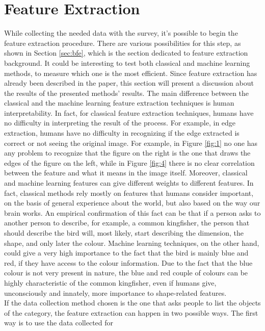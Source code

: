 \documentclass[conference]{IEEEtran}
\begin{document}
	\section{Feature Extraction\label{sec:fe}}

		\noindent While collecting the needed data with the survey, it's possible to begin the feature extraction procedure. There are various possibilities for this step, as shown in Section \ref{sec:bfe}, which is
		the section dedicated to feature extraction background. 
		It could be interesting to test both classical and machine learning methods, to measure which one is the most efficient. Since feature extraction has already been described in the paper, this section will 
		present a discussion about the results of the presented methods' results. The main difference between the classical and the machine learning feature extraction techniques is human interpretability. 
		In fact, for classical feature extraction techniques, humans have no difficulty in interpreting the result of the process. For example, in edge extraction, humans have no difficulty in recognizing if the 
		edge extracted is correct or not seeing the original image. For example, in Figure \ref{fig:1} no one has any problem to recognize that the figure on the right is the one that draws the edges of the figure on the left, 
		while in Figure \ref{fig:4} there is no clear correlation between the feature and what it means in the image itself.
		Moreover, classical and machine learning features can give different weights to different features. 
		In fact, classical methods rely mostly on features that humans consider important, on the basis of general experience about the world, but also based on the way our brain works. An empirical confirmation of this fact 
		can be that if a person asks to another person to describe, for example, a common kingfisher, the person that should describe the bird will, most likely, start describing the dimension, the shape, and only 
		later the colour. Machine learning techniques, on the other hand, could give a very high importance to the fact that the bird is mainly blue and red, if they have access to the colour information. Due to the fact that 
		the blue colour is not very present in nature, the blue and red couple of colours can be highly characteristic of the common kingfisher, even if humans give, unconsciously and innately, more importance to 
		shape-related features.	\\
		If the data collection method chosen is the one that asks people to list the objects of the category, the feature extraction can happen in two possible ways. The first way is to use the data collected for 
\end{document}
